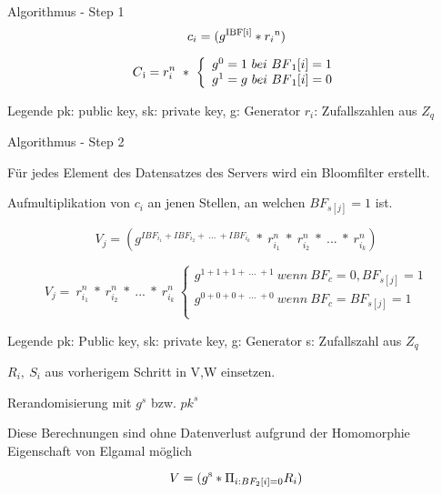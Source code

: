 \documentclass{beamer}
\begin{document}
	\begin{frame}{Algorithmus - Step 1}
		$$c_i = (g \textsuperscript{IBF[i]}  * r_{i}\textsuperscript{n})$$
		
		
		\[
		C\textsubscript{i} = r_{i}^{n} \ * \ \left\{
		\begin{array}{ll}
		g^{0} = 1 \ bei \  BF\textsubscript{1}[i]=1\\
		g^{1} = g \ bei \ BF\textsubscript{1}[i]=0\\
		\end{array}
		\right.
		\]
		
		\begin{block}{Legende}
			pk: public key, sk: private key, g: Generator $r_i$: Zufallszahlen aus $Z_q$ 
		\end{block}
		
	\end{frame}
	
	\begin{frame}{Algorithmus - Step 2}
		
		\begin{arrowlist}
			\item Für jedes Element des Datensatzes des Servers wird ein Bloomfilter erstellt.
			\item Aufmultiplikation  von $c_i$  an jenen Stellen, an welchen $BF_{s[j]}= 1$ ist.
		\end{arrowlist}
		
		
			$$ V_{j} = (g^{ IBF_{i_{1}} + IBF_{i_{2}} + \ ...\ +IBF_{i_{k}}} \ * \ r_{i_{1}}^{n} \ * \ r_{i_{2}}^{n} \ * \ ...\ * \  r_{i_{k}}^{n})$$
			
			\[
			V_{j} = \ r_{i_{1}}^{n} \ * \ r_{i_{2}}^{n} \ * \ ...\ * \  r_{i_{k}}^{n} \ \left\{
			\begin{array}{ll}
			g^{1 + 1 + 1 + \ ...\ +1} \ wenn \ BF_{c} = 0,BF_{s[j]} = 1 \\
			g^{0 + 0 + 0 + \ ...\ +0} \ wenn \ BF_{c} = BF_{s[j]} = 1\\
			\end{array}
			\right.
			\]
			
			
			\begin{block}{Legende}
				pk: Public key, sk: private key, g: Generator s: Zufallszahl aus $Z_q$
			\end{block}
			
		\end{frame}
	
	\begin{frame}
		
		\begin{arrowlist}
			\item $R_{i}, \  S_{i}$ aus vorherigem Schritt in V,W einsetzen.
			\item Rerandomisierung mit $g^s$ bzw. $pk^s$ 
			\item Diese Berechnungen sind ohne Datenverlust aufgrund der Homomorphie Eigenschaft von Elgamal möglich
		\end{arrowlist}	
		$$ V = (g \textsuperscript{s} * \Pi_{i:BF_{2}[i] = 0} R_{i} )$$
	\end{frame}
\end{document}
